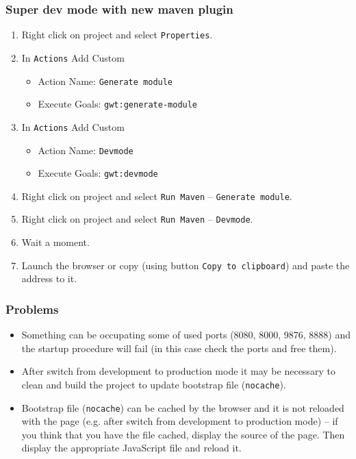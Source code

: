 \documentclass[10pt,table, xcolor=pdflatex]{beamer}
\begin{document}
\begin{frame}\frametitle{Super dev mode with new maven plugin}
  \begin{enumerate}
    \item Right click on project and select \texttt{Properties}.
    \item In \texttt{Actions} Add Custom
      \begin{itemize}
        \item Action Name: \texttt{Generate module}
        \item Execute Goals: \texttt{gwt:generate-module}
      \end{itemize}
    \item In \texttt{Actions} Add Custom
      \begin{itemize}
        \item Action Name: \texttt{Devmode}
        \item Execute Goals: \texttt{gwt:devmode}
      \end{itemize}  
    \item Right click on project and select \texttt{Run Maven} -- \texttt{Generate module}.
    \item Right click on project and select \texttt{Run Maven} -- \texttt{Devmode}.
    \item Wait a moment.
    \item Launch the browser or copy (using button \texttt{Copy to clipboard}) and paste the address to it.
  \end{enumerate}
\end{frame}


\begin{frame}\frametitle{Problems}
  \begin{itemize}
    \item Something can be occupating some of used ports (8080, 8000, 9876, 8888) and the startup procedure will fail (in this case check the ports and free them).
    \item After switch from development to production mode it may be necessary to clean and build the project to update bootstrap file (\texttt{nocache}).
    \item Bootstrap file (\texttt{nocache}) can be cached by the browser and it is not reloaded with the page (e.g. after switch from development to production mode) -- if you think that you have the file cached, display the source of the page. Then display the appropriate JavaScript file and reload it.
  \end{itemize}
\end{frame}
\end{document}
